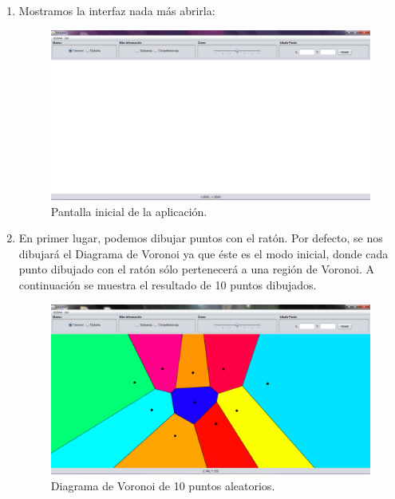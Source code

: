 \begin{enumerate}
        \item Mostramos la interfaz nada más abrirla: 
        \begin{figure} [H]
            \centering
            \includegraphics[scale=0.4]{imagenes/inicio.png}
            \caption{Pantalla inicial de la aplicación.}
        \end{figure}
    
        \item En primer lugar, podemos dibujar puntos con el ratón. Por defecto, se nos dibujará el Diagrama de Voronoi ya que éste es el modo inicial, donde cada punto dibujado con el ratón sólo pertenecerá a una región de Voronoi. A continuación se muestra el resultado de 10 puntos dibujados.      
        \begin{figure}  [H]
            \centering
            \includegraphics[scale=0.3]{imagenes/voronoi10puntos.png}
            \caption{Diagrama de Voronoi de 10 puntos aleatorios.}
        \end{figure}
                

\end{enumerate}
